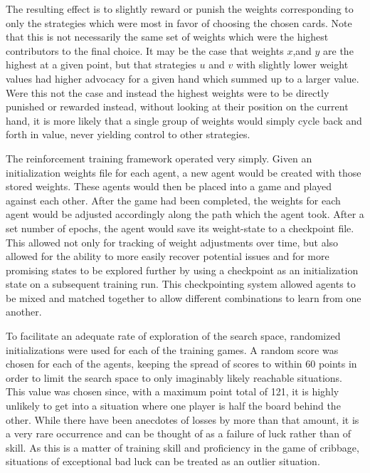 The resulting effect is to slightly reward or punish the weights
corresponding to only the strategies which were most in favor of choosing
the chosen cards.
%
Note that this is not necessarily the same set of weights which were the highest
contributors to the final choice.
%
It may be the case that weights $x$,and $y$ are the highest at a given point,
but that strategies $u$ and $v$ with slightly lower weight values had higher
advocacy for a given hand which summed up to a larger value.
%
Were this not the case and instead the highest weights were to be directly
punished or rewarded instead,
without looking at their position on the current hand,
it is more likely that a single group of weights would simply cycle
back and forth in value, never yielding control to other strategies.


The reinforcement training framework operated very simply.
%
Given an initialization weights file for each agent, a new agent would be
created with those stored weights.
%
These agents would then be placed into a game and played against each other.
%
After the game had been completed, the weights for each agent would be adjusted
accordingly along the path which the agent took.
%
After a set number of epochs, the agent would save its weight-state to a
checkpoint file.
%
This allowed not only for tracking of weight adjustments over time, but also
allowed for the ability to more easily recover potential issues and for more
promising states to be explored further by using a checkpoint as an
initialization state on a subsequent training run.
%
This checkpointing system allowed agents to be mixed and matched together to
allow different combinations to learn from one another.

%
To facilitate an adequate rate of exploration of the search space,
randomized initializations were used for each of the training games.
%
A random score was chosen for each of the agents,
keeping the spread of scores to within 60 points
in order to limit the search space to only imaginably likely reachable
situations.
%
This value was chosen since,
with a maximum point total of 121,
it is highly unlikely to get into a situation where one player is half the board
behind the other.
%
While there have been anecdotes of losses by more than that amount,
it is a very rare occurrence and can be thought of as a failure of luck
rather than of skill.
%
As this is a matter of training skill and proficiency in the game of cribbage,
situations of exceptional bad luck can be treated as an outlier situation.

